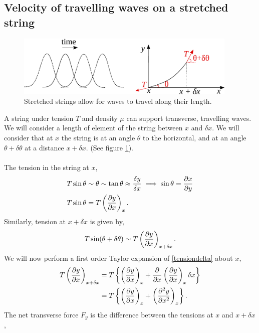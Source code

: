\documentclass{book}
\begin{document}
\subsection{Velocity of travelling waves on a stretched string}
\begin{figure}[b]
    \centering
    \includegraphics[width=300pt]{string.pdf}
    \caption{Stretched strings allow for waves to travel along their length.}
    \label{fig:stretchesstring}
\end{figure}
A string under tension $T$ and density $\mu$ can support transverse, travelling waves. We will consider a length of element of the string between $x$ and $\delta x$. We will consider that at $x$ the string is at an angle $\theta$ to the horizontal, and at an angle $\theta + \delta\theta$ at a distance $x + \delta x$. (See figure \ref{fig:stretchesstring}).
\\\\
The tension in the string at $x$,
\begin{equation}
\begin{split}
    & T\sin\theta \sim \theta \sim \tan\theta \approx \frac{\delta y}{\delta x} \implies \sin\theta = \pdv{x}{y} \\ &T\sin\theta = T\left(\pdv{y}{x}\right)_x.
\end{split}
\end{equation}
Similarly, tension at $x + \delta x$ is given by,
\begin{equation}
    T\sin(\theta + \delta\theta) \sim T\left(\pdv{y}{x}\right)_{x+\delta x}. \label{tensiondelta}
\end{equation}
We will now perform a first order Taylor expansion of \eqref{tensiondelta} about $x$,
\begin{equation}
    \begin{split}
        T\left(\pdv{y}{x}\right)_{x+\delta x} & = T\left\{\left(\pdv{y}{x}\right)_x + \pdv{}{x}\left(\pdv{y}{x}\right)_x\delta x\right\} \\
        & = T\left\{\left(\pdv{y}{x}\right)_x+\left(\pdv[2]{y}{x}\right)_x\right\}.
    \end{split}
\end{equation}
The net transverse force $F_y$ is the difference between the tensions at $x$ and $x + \delta x$,
\end{document}
